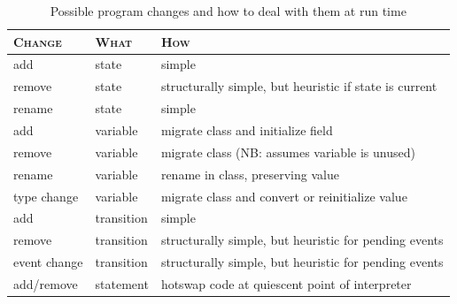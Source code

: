 \documentclass[english,submission]{programming}
\begin{document}
\begin{table}[t]
  \centering
\begin{tabular}{lll}\toprule
\textsc{Change} & \textsc{What} & \textsc{How}\\\midrule
add & state & simple  \\
remove & state & structurally simple, but heuristic if state is current \\
rename & state & simple\\
add & variable & migrate class and initialize field \\
remove & variable & migrate class (NB: assumes variable is unused)\\
rename & variable & rename in class, preserving value\\
type change & variable & migrate class and convert or reinitialize value \\
add & transition & simple \\
remove & transition & structurally simple, but heuristic for pending events\\
event change & transition & structurally simple, but heuristic for pending events\\
add/remove & statement & hotswap code at quiescent point of interpreter\\
\bottomrule
\end{tabular}
\caption{Possible program changes and how to deal with them at run time}
\label{TBL:changes}
\end{table}
\end{document}
